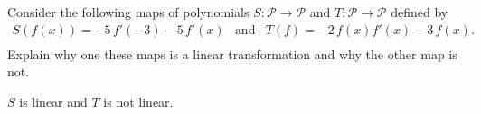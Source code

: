 
\begin{exerciseStatement}


Consider the following maps of polynomials \(S:\mathcal{P}\rightarrow\mathcal{P}\) and \(T:\mathcal{P}\rightarrow\mathcal{P}\) defined by 
\begin{align*} S(f(x))= -5 \, f'\left(-3\right) - 5 \, f'\left(x\right)  & \text{and} & T(f)= -2 \, f\left(x\right) f'\left(x\right) - 3 \, f\left(x\right) . \\ \end{align*}
             Explain why one these maps is a linear transformation and why the other map is not. 


\end{exerciseStatement}
    
\begin{exerciseAnswer} 


\(S\) is linear and \(T\) is not linear.


\end{exerciseAnswer}
    
